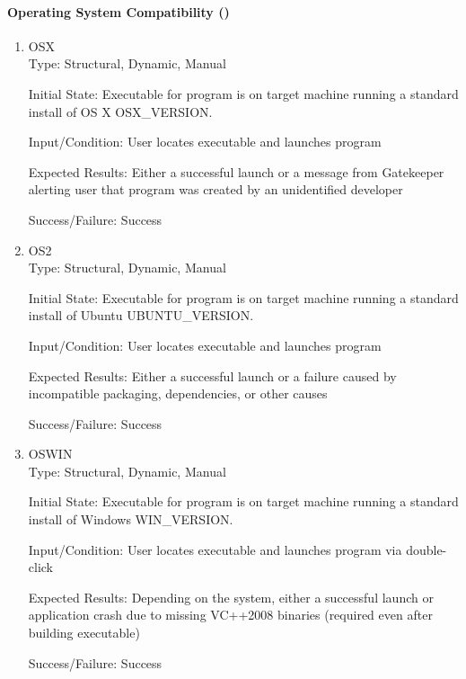 \documentclass[12pt, titlepage]{article}
\begin{document}
	\paragraph{Operating System Compatibility ()}
	\begin{enumerate}
		\item{OSX\\}
		Type: Structural, Dynamic, Manual
		
		Initial State: Executable for program is on target machine running a
		standard install of OS X OSX\_VERSION.
		
		Input/Condition: User locates executable and launches program
		
		Expected Results: Either a successful launch or a message from Gatekeeper
		alerting user that program was created by an unidentified developer

		Success/Failure: Success
		
		\item{OS2\\}
		Type: Structural, Dynamic, Manual
		
		Initial State: Executable for program is on target machine running a
		standard install of Ubuntu UBUNTU\_VERSION.
		
		Input/Condition: User locates executable and launches program
		
		Expected Results: Either a successful launch or a failure caused by incompatible
		packaging, dependencies, or other causes

		Success/Failure: Success

		\item{OSWIN\\}
		Type: Structural, Dynamic, Manual
		
		Initial State: Executable for program is on target machine running a
		standard install of Windows WIN\_VERSION.
		
		Input/Condition: User locates executable and launches program via double-click
		
		Expected Results: Depending on the system, either a successful launch or
		application crash due to missing VC++2008 binaries (required even after 
		building executable)

		Success/Failure: Success
	\end{enumerate}
\end{document}

